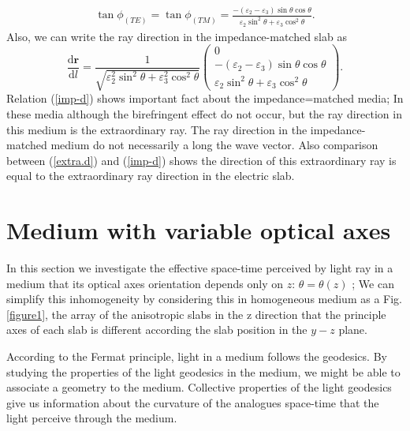 \documentclass[9pt,twocolumn,twoside]{osajnl}
\begin{document}
\begin{align}\label{tanp}
\tan{\phi}_{(TE)}=\tan{\phi}_{(TM)}=\frac{-(\varepsilon_{2}-\varepsilon_{3})\sin{\theta}\cos{\theta}}{\varepsilon_{2} \sin^{2}{\theta} + \varepsilon_{3}\cos^{2}{\theta}}.
\end{align}
Also, we can write the ray direction in the impedance-matched slab as 
\begin{equation}\label{imp-d}
\dfrac{\mathbf{\mathrm{d}{r}}}{\mathrm{d}{l}}=\dfrac{1}{\sqrt{\varepsilon_{2}^{2} \sin^{2}{\theta} + \varepsilon_{3}^{2}\cos^{2}{\theta}}}
 \begin{pmatrix}
 0\\ -(\varepsilon_{2}-\varepsilon_{3})\sin{\theta}\cos{\theta}  \\  \varepsilon_{2} \sin^{2}{\theta} + \varepsilon_{3}\cos^{2}{\theta}
 \end{pmatrix}.
\end{equation}
Relation (\ref{imp-d})  shows important fact about the impedance=matched media; In these media although the birefringent effect do not occur, but the ray direction in this medium is the extraordinary ray. The ray direction in the impedance-matched medium do not necessarily a long the wave vector. Also comparison between (\ref{extra.d}) and (\ref{imp-d}) shows the direction of this extraordinary ray is equal to the extraordinary ray direction in the electric slab.

 
 
\section{Medium with variable optical axes}

In this section we investigate the effective space-time perceived by light ray in a medium that its optical axes orientation depends only on $z$:  $\theta=\theta(z)$ ;
We can simplify this inhomogeneity by considering this in homogeneous medium as a Fig. \ref{figure1}, the array of the anisotropic slabs in the z direction that the principle axes of each slab is different according the slab position in the $y-z$ plane. 

According to the Fermat principle, light  in a medium follows the geodesics. By studying the properties of the light geodesics in the medium, we might be able to associate a geometry to the medium.
Collective properties of the light geodesics give us information about the curvature of the analogues space-time that the light perceive through the medium.
\end{document}
